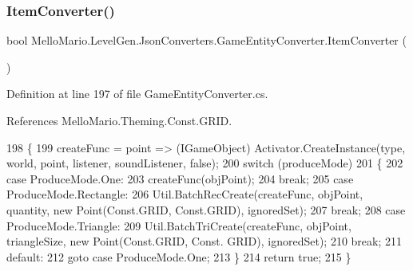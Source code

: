 \subsubsection{Item\+Converter()}
{\footnotesize\ttfamily bool Mello\+Mario.\+Level\+Gen.\+Json\+Converters.\+Game\+Entity\+Converter.\+Item\+Converter (\begin{DoxyParamCaption}{ }\end{DoxyParamCaption})\hspace{0.3cm}{\ttfamily [private]}}



Definition at line 197 of file Game\+Entity\+Converter.\+cs.



References Mello\+Mario.\+Theming.\+Const.\+G\+R\+ID.


\begin{DoxyCode}
198         \{
199             createFunc = point => (IGameObject) Activator.CreateInstance(type, 
      world, point, listener, soundListener, \textcolor{keyword}{false});
200             \textcolor{keywordflow}{switch} (produceMode)
201             \{
202                 \textcolor{keywordflow}{case} ProduceMode.One:
203                     createFunc(objPoint);
204                     \textcolor{keywordflow}{break};
205                 \textcolor{keywordflow}{case} ProduceMode.Rectangle:
206                     Util.BatchRecCreate(createFunc, objPoint, quantity, \textcolor{keyword}{new} Point(Const.GRID, Const.GRID), 
      ignoredSet);
207                     \textcolor{keywordflow}{break};
208                 \textcolor{keywordflow}{case} ProduceMode.Triangle:
209                     Util.BatchTriCreate(createFunc, objPoint, triangleSize, \textcolor{keyword}{new} Point(Const.GRID, Const.
      GRID), ignoredSet);
210                     \textcolor{keywordflow}{break};
211                 \textcolor{keywordflow}{default}:
212                     \textcolor{keywordflow}{goto} \textcolor{keywordflow}{case} ProduceMode.One;
213             \}
214             \textcolor{keywordflow}{return} \textcolor{keyword}{true};
215         \}
\end{DoxyCode}
\mbox{\label{classMelloMario_1_1LevelGen_1_1JsonConverters_1_1GameEntityConverter_a5dfe209b59617d72f476fb940a7c9e79}} 
